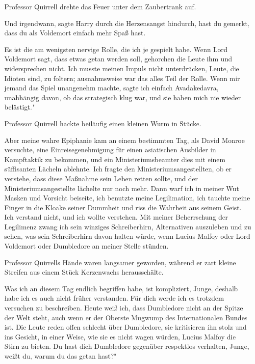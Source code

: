 Professor Quirrell drehte das Feuer unter dem Zaubertrank auf.

\glqq{}Und irgendwann\grqq{}, sagte Harry durch die Herzensangst hindurch, \glqq
hast du gemerkt, dass du als Voldemort einfach mehr Spaß hast.\grqq{}

\glqq{}Es ist die am wenigsten nervige Rolle, die ich je gespielt habe. Wenn Lord
Voldemort sagt, dass etwas getan werden soll, gehorchen die Leute ihm und
widersprechen nicht. Ich musste meinen Impuls nicht unterdrücken, Leute, die
Idioten sind, zu foltern; ausnahmsweise war das alles Teil der Rolle. Wenn mir
jemand das Spiel unangenehm machte, sagte ich einfach Avadakedavra, unabhängig
davon, ob das strategisch klug war, und sie haben mich nie wieder belästigt."

Professor Quirrell hackte beiläufig einen kleinen Wurm in Stücke.

\glqq{}Aber meine wahre Epiphanie kam an einem bestimmten Tag, als David Monroe
versuchte, eine Einreisegenehmigung für einen asiatischen Ausbilder in
Kampftaktik zu bekommen, und ein Ministeriumsbeamter dies mit einem süffisanten
Lächeln ablehnte. Ich fragte den Ministeriumsangestellten, ob er verstehe, dass
diese Maßnahme sein Leben retten sollte, und der Ministeriumsangestellte
lächelte nur noch mehr. Dann warf ich in meiner Wut Masken und Vorsicht
beiseite, ich benutzte meine Legilimation, ich tauchte meine Finger in die
Kloake seiner Dummheit und riss die Wahrheit aus seinem Geist. Ich verstand
nicht, und ich wollte verstehen. Mit meiner Beherrschung der Legilimenz zwang
ich sein winziges Schreiberhirn, Alternativen auszuleben und zu sehen, was sein
Schreiberhirn davon halten würde, wenn Lucius Malfoy oder Lord Voldemort oder
Dumbledore an meiner Stelle stünden.\grqq{}

Professor Quirrells Hände waren langsamer geworden, während er zart kleine
Streifen aus einem Stück Kerzenwachs herausschälte.

\glqq{}Was ich an diesem Tag endlich begriffen habe, ist kompliziert, Junge,
deshalb habe ich es auch nicht früher verstanden. Für dich werde ich es trotzdem
versuchen zu beschreiben. Heute weiß ich, dass Dumbledore nicht an der Spitze
der Welt steht, auch wenn er der Oberste Mugwump des Internationalen Bundes ist.
Die Leute reden offen schlecht über Dumbledore, sie kritisieren ihn stolz und
ins Gesicht, in einer Weise, wie sie es nicht wagen würden, Lucius Malfoy die
Stirn zu bieten. Du hast dich Dumbledore gegenüber respektlos verhalten, Junge,
weißt du, warum du das getan hast?"

